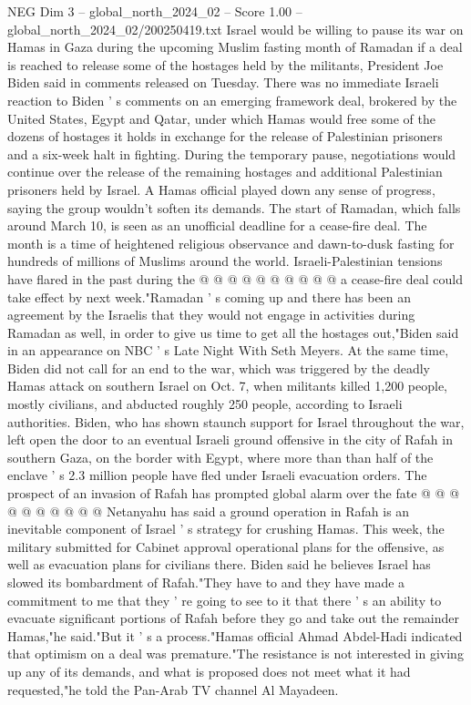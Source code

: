 \begin{textsample}{NEG Dim 3 – global\_north\_2024\_02 – Score 1.00 – global\_north\_2024\_02/200250419.txt}  \label{ex:f3_neg_209}
Israel would be willing to pause its war on Hamas in Gaza during the upcoming Muslim fasting month of Ramadan if a deal is reached to release some of the hostages held by the militants, President Joe Biden said in comments released on Tuesday.
There was no immediate Israeli reaction to Biden ' s comments on an emerging framework deal, brokered by the United States, Egypt and Qatar, under which Hamas would free some of the dozens of hostages it holds in exchange for the release of Palestinian prisoners and a six-week halt in fighting.
During the temporary pause, negotiations would continue over the release of the remaining hostages and additional Palestinian prisoners held by Israel.
A Hamas official played down any sense of progress, saying the group wouldn't soften its demands.
The start of Ramadan, which falls around March 10, is seen as an unofficial deadline for a cease-fire deal.
The month is a time of heightened religious observance and dawn-to-dusk fasting for hundreds of millions of Muslims around the world.
Israeli-Palestinian tensions have flared in the past during the @ @ @ @ @ @ @ @ @ @ a cease-fire deal could take effect by next week."Ramadan ' s coming up and there has been an agreement by the Israelis that they would not engage in activities during Ramadan as well, in order to give us time to get all the hostages out,"Biden said in an appearance on NBC ' s Late Night With Seth Meyers.
At the same time, Biden did not call for an end to the war, which was triggered by the deadly Hamas attack on southern Israel on Oct. 7, when militants killed 1,200 people, mostly civilians, and abducted roughly 250 people, according to Israeli authorities.
Biden, who has shown staunch support for Israel throughout the war, left open the door to an eventual Israeli ground offensive in the city of Rafah in southern Gaza, on the border with Egypt, where more than than half of the enclave ' s 2.3 million people have fled under Israeli evacuation orders.
The prospect of an invasion of Rafah has prompted global alarm over the fate @ @ @ @ @ @ @ @ @ @ Netanyahu has said a ground operation in Rafah is an inevitable component of Israel ' s strategy for crushing Hamas.
This week, the military submitted for Cabinet approval operational plans for the offensive, as well as evacuation plans for civilians there.
Biden said he believes Israel has slowed its bombardment of Rafah."They have to and they have made a commitment to me that they ' re going to see to it that there ' s an ability to evacuate significant portions of Rafah before they go and take out the remainder Hamas,"he said."But it ' s a process."Hamas official Ahmad Abdel-Hadi indicated that optimism on a deal was premature."The resistance is not interested in giving up any of its demands, and what is proposed does not meet what it had requested,"he told the Pan-Arab TV channel Al Mayadeen.

\end{textsample}
